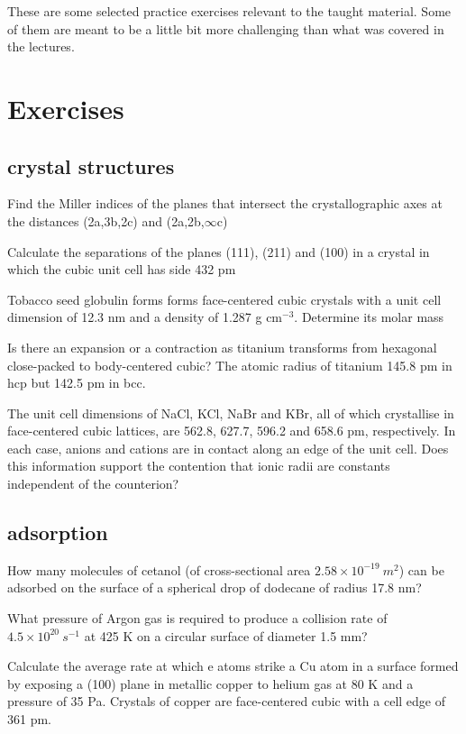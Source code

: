 \documentclass[a4paper,12pt,titlepage]{article}
\begin{document}
These are some selected practice exercises relevant to the taught material. Some of them are meant to be a little bit more challenging than what was covered in the lectures.
\section{Exercises}

\subsection{crystal structures}
\begin{ExerciseList}
\Exercise Find the Miller indices of the planes that intersect the crystallographic axes at the distances (2a,3b,2c) and (2a,2b,\(\infty\)c)


\Exercise Calculate the separations of the planes (111), (211) and (100) in a crystal in which the cubic unit cell has side 432 pm

\Exercise Tobacco seed globulin forms forms face-centered cubic crystals with a unit cell dimension of 12.3 nm and a density of 1.287 g cm\(^{-3}\). Determine its molar mass

\Exercise Is there an expansion or a contraction as titanium transforms from hexagonal close-packed to body-centered cubic? The atomic radius of titanium 145.8 pm in hcp but 142.5 pm in bcc.

\Exercise The unit cell dimensions of NaCl, KCl, NaBr and KBr, all of which crystallise in face-centered cubic lattices, are 562.8, 627.7, 596.2 and 658.6 pm, respectively. In each case, anions and cations are in contact along an edge of the unit cell. Does this information support the contention that ionic radii are constants independent of the counterion?

\subsection{adsorption}
\Exercise How many molecules of cetanol (of cross-sectional area \(2.58\times10^{-19}\ m^2\)) can be adsorbed on the surface of a spherical drop of dodecane of radius 17.8 nm?

\Exercise What pressure of Argon gas is required to produce a collision rate of \(4.5\times10^{20}\ s^{-1}\) at 425 K on a circular surface of diameter 1.5 mm?

\Exercise Calculate the average rate at which e atoms strike a Cu atom in a surface formed by exposing a (100) plane in metallic copper to helium gas at 80 K and a pressure of 35 Pa. Crystals of copper are face-centered cubic with a cell edge of 361 pm.


\end{ExerciseList}
\end{document}
